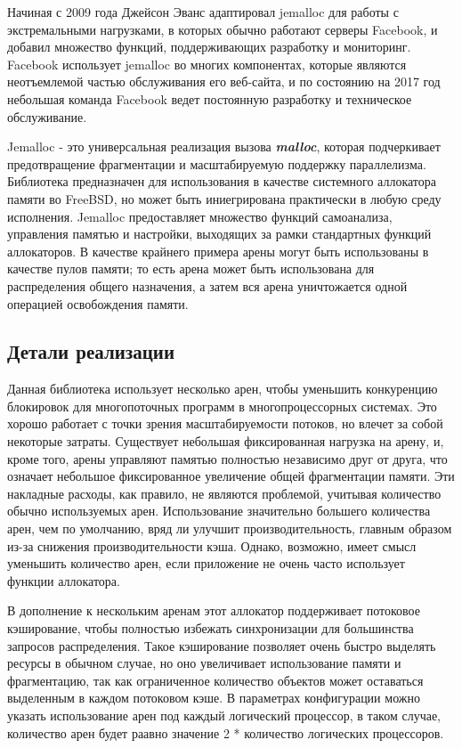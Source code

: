 Начиная с 2009 года Джейсон Эванс адаптировал jemalloc для работы с экстремальными нагрузками, в которых обычно работают серверы Facebook, и добавил множество функций, поддерживающих разработку и мониторинг. Facebook использует jemalloc во многих компонентах, которые являются неотъемлемой частью обслуживания его веб-сайта, и по состоянию на 2017 год небольшая команда Facebook ведет постоянную разработку и техническое обслуживание.

Jemalloc - это универсальная реализация вызова \textit{\textbf{malloc}}, которая подчеркивает предотвращение фрагментации и масштабируемую поддержку параллелизма. Библиотека предназначен для использования в качестве системного аллокатора памяти во FreeBSD, но может быть иниегрирована практически в любую среду исполнения. Jemalloc предоставляет множество функций самоанализа, управления памятью и настройки, выходящих за рамки стандартных функций аллокаторов. В качестве крайнего примера арены могут быть использованы в качестве пулов памяти; то есть арена может быть использована для распределения общего назначения, а затем вся арена уничтожается одной операцией освобождения памяти.

\subsection{Детали реализации}
Данная библиотека использует несколько арен, чтобы уменьшить конкуренцию блокировок для многопоточных программ в многопроцессорных системах. Это хорошо работает с точки зрения масштабируемости потоков, но влечет за собой некоторые затраты. Существует небольшая фиксированная нагрузка на арену, и, кроме того, арены управляют памятью полностью независимо друг от друга, что означает небольшое фиксированное увеличение общей фрагментации памяти. Эти накладные расходы, как правило, не являются проблемой, учитывая количество обычно используемых арен. Использование значительно большего количества арен, чем по умолчанию, вряд ли улучшит производительность, главным образом из-за снижения производительности кэша. Однако, возможно, имеет смысл уменьшить количество арен, если приложение не очень часто использует функции аллокатора.

В дополнение к нескольким аренам этот аллокатор поддерживает потоковое кэширование, чтобы полностью избежать синхронизации для большинства запросов распределения. Такое кэширование позволяет очень быстро выделять ресурсы в обычном случае, но оно увеличивает использование памяти и фрагментацию, так как ограниченное количество объектов может оставаться выделенным в каждом потоковом кэше. В параметрах конфигурации можно указать использование арен под каждый логический процессор, в таком случае, количество арен будет раавно значение 2 * количество логических процессоров.

